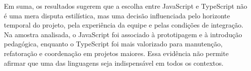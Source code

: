 Em suma, os resultados sugerem que a escolha entre JavaScript e TypeScript não é uma mera disputa estilística, mas uma decisão influenciada pelo horizonte temporal do projeto, pela experiência da equipe e pelas condições de integração. Na amostra analisada, o JavaScript foi associado à prototipagem e à introdução pedagógica, enquanto o TypeScript foi mais valorizado para manutenção, refatoração e coordenação em projetos maiores. Essa evidência não permite afirmar que uma das linguagens seja indispensável em todos os contextos.
